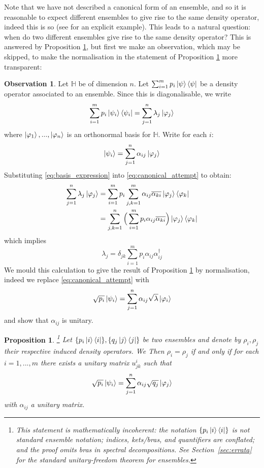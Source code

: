\documentclass[12pt]{article}
\theoremstyle{plain}
\newtheorem{proposition}[thm]{Proposition}
\theoremstyle{definition}
\newtheorem{observation}[thm]{Observation}
\newcommand{\bb}[1]{\mathbb{#1}}
\begin{document}
Note that we have not described a canonical form of an ensemble, and so it is reasonable to expect different ensembles to give rise to the same density operator, indeed this is so (see \cite[Page 103]{quantum_compuiting} for an explicit example).  This leads to a natural question: when do two different ensembles give rise to the same density operator? This is answered by Proposition \ref{prop:equivalent_density_operators}, but first we make an observation, which may be skipped, to make the normalisation in the statement of Proposition \ref{prop:equivalent_density_operators} more transparent:
\begin{observation}
Let $\bb{H}$ be of dimension $n$. Let $\sum_{i = 1}^m p_i \ket{\psi}\bra{\psi}$ be a density operator associated to an ensemble. Since this is diagonalisable, we write
\begin{equation}\label{eq:canonical_attempt}
\sum_{i = 1}^m p_i \ket{\psi_i}\bra{\psi_i} = \sum_{j = 1}^n \lambda_j \ket{\varphi_j}
\end{equation}
where $\ket{\varphi_1},...,\ket{\varphi_n}$ is an orthonormal basis for $\bb{H}$. Write for each $i$:
\begin{equation}\label{eq:basis_expression}
\ket{\psi_i} = \sum_{j = 1}^n \alpha_{ij}\ket{\varphi_j}
\end{equation}
Substituting \eqref{eq:basis_expression} into \eqref{eq:canonical_attempt} to obtain:
\begin{align*}
\sum_{j = 1}^n \lambda_j \ket{\varphi_j} &= \sum_{i = 1}^m p_i \sum_{j,k = 1}^m \alpha_{ij}\overline{\alpha_{ki}} \ket{\varphi_j}\bra{\varphi_k}\\
&= \sum_{j,k = 1}^n\Big(\sum_{i = 1}^m p_i \alpha_{ij}\overline{\alpha_{ki}}\Big)\ket{\varphi_j}\bra{\varphi_k}
\end{align*}
which implies
\begin{equation}
\lambda_j = \delta_{jk}\sum_{i = 1}^m p_i \alpha_{ij}\alpha_{ij}^\dagger
\end{equation}
We mould this calculation to give the result of Proposition \ref{prop:equivalent_density_operators} by normalisation, indeed we replace \eqref{eq:canonical_attempt} with
\begin{equation}
\sqrt{p_i}\ket{\psi_i} = \sum_{j = 1}^n \alpha_{ij}\sqrt{\lambda}\ket{\varphi_i}
\end{equation}
and show that $\alpha_{ij}$ is unitary.
\end{observation}
\begin{proposition}\label{prop:equivalent_density_operators}\footnote{This statement is mathematically incoherent: the notation $\{p_i\ket{i}\bra{i}\}$ is not standard ensemble notation; indices, kets/bras, and quantifiers are conflated; and the proof omits bras in spectral decompositions. See Section~\ref{sec:errata} for the standard unitary-freedom theorem for ensembles.}
Let $\lbrace p_i \ket{i}\bra{i}\rbrace ,\lbrace  q_j \ket{j}\bra{j}\rbrace$ be two ensembles and denote by $\rho_i,\rho_j$ their respective induced density operators. We Then $\rho_i = \rho_j$ if and only if for each $i = 1,...,m$ there exists a unitary matrix $u^i_{jk}$ such that $$\sqrt{p_i}\ket{\psi_i} = \sum_{j = 1}^n \alpha_{ij}\sqrt{q_j}\ket{\varphi_j}$$ with $\alpha_{ij}$ a unitary matrix.
\end{proposition}
\end{document}
